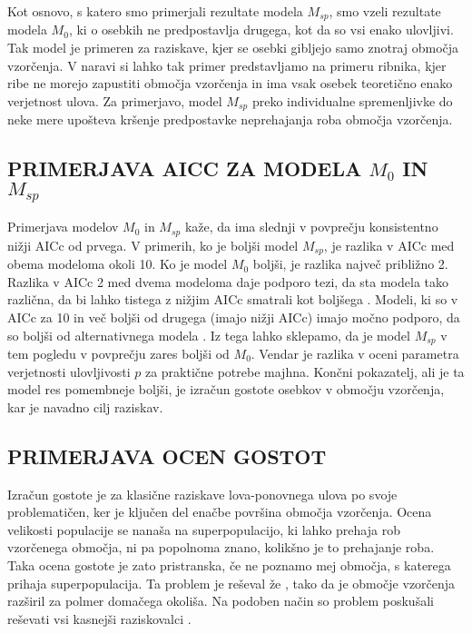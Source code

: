 Kot osnovo, s katero smo primerjali rezultate modela $M_{sp}$, smo vzeli rezultate modela $M_0$, ki o osebkih ne predpostavlja drugega, kot da so vsi enako ulovljivi. Tak model je primeren za raziskave, kjer se osebki gibljejo samo znotraj območja vzorčenja. V naravi si lahko tak primer predstavljamo na primeru ribnika, kjer ribe ne morejo zapustiti območja vzorčenja in ima vsak osebek teoretično enako verjetnost ulova. Za primerjavo, model $M_{sp}$ preko individualne spremenljivke do neke mere upošteva kršenje predpostavke neprehajanja roba območja vzorčenja.

\subsection{PRIMERJAVA AICC ZA MODELA $M_0$ IN $M_{sp}$}
Primerjava modelov $M_0$ in $M_{sp}$ kaže, da ima slednji v povprečju konsistentno nižji AICc od prvega. V primerih, ko je boljši model $M_{sp}$, je razlika v AICc med obema modeloma okoli 10. Ko je model $M_0$ boljši, je razlika največ približno 2. Razlika v AICc 2 med dvema modeloma daje podporo tezi, da sta modela tako različna, da bi lahko tistega z nižjim AICc smatrali kot boljšega \citep{boulanger_corrigendum_2001}. Modeli, ki so v AICc za 10 in več boljši od drugega (imajo nižji AICc) imajo močno podporo, da so boljši od alternativnega modela \citep{burnham_model_2002}. Iz tega lahko sklepamo, da je model $M_{sp}$ v tem pogledu v povprečju zares boljši od $M_0$. Vendar je razlika v oceni parametra verjetnosti ulovljivosti $p$ za praktične potrebe majhna. Končni pokazatelj, ali je ta model res pomembneje boljši, je izračun gostote osebkov v območju vzorčenja, kar je navadno cilj raziskav.

\subsection{PRIMERJAVA OCEN GOSTOT}
Izračun gostote je za klasične raziskave lova-ponovnega ulova po svoje problematičen, ker je ključen del enačbe površina območja vzorčenja. Ocena velikosti populacije se nanaša na superpopulacijo, ki lahko prehaja rob vzorčenega območja, ni pa popolnoma znano, kolikšno je to prehajanje roba. Taka ocena gostote je zato pristranska, če ne poznamo mej območja, s katerega prihaja superpopulacija. Ta problem je reševal že \citet{dice_census_1938}, tako da je območje vzorčenja razširil za polmer domačega okoliša. Na podoben način so problem poskušali reševati vsi kasnejši raziskovalci \citep{williams_analysis_2002}.


